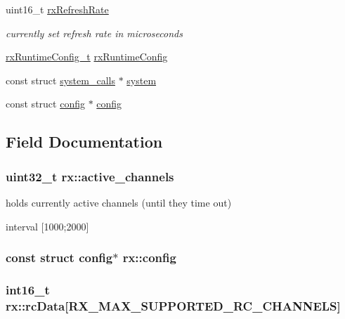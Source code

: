 \begin{DoxyCompactItemize}
uint16\+\_\+t \hyperlink{structrx_a3aade475c0c219609047fba39dce9a2a}{rx\+Refresh\+Rate}
\begin{DoxyCompactList}\small\item\em currently set refresh rate in microseconds \end{DoxyCompactList}\item 
\hyperlink{rx_2rx_8h_a42f050b55773f3d2df861b5860040fe8}{rx\+Runtime\+Config\+\_\+t} \hyperlink{structrx_a72a978d821ed96dde83bf645e959baa3}{rx\+Runtime\+Config}
\item 
const struct \hyperlink{structsystem__calls}{system\+\_\+calls} $\ast$ \hyperlink{structrx_a5fb9599652a09d1518e942c47bc0952c}{system}
\item 
const struct \hyperlink{structconfig}{config} $\ast$ \hyperlink{structrx_a4349b17cd083df91b2a1a9e2b689a968}{config}
\end{DoxyCompactItemize}


\subsection{Field Documentation}
\hypertarget{structrx_abfc8fd64f3a67de351da4d93de14aa59}{
\subsubsection[{active\+\_\+channels}]{\setlength{\rightskip}{0pt plus 5cm}uint32\+\_\+t rx\+::active\+\_\+channels}}\label{structrx_abfc8fd64f3a67de351da4d93de14aa59}


holds currently active channels (until they time out) 

interval \mbox{[}1000;2000\mbox{]} \hypertarget{structrx_a4349b17cd083df91b2a1a9e2b689a968}{
\subsubsection[{config}]{\setlength{\rightskip}{0pt plus 5cm}const struct {\bf config}$\ast$ rx\+::config}}\label{structrx_a4349b17cd083df91b2a1a9e2b689a968}
\hypertarget{structrx_a425ca7aa37d8d1c486f47104b4409e9a}{
\subsubsection[{rc\+Data}]{\setlength{\rightskip}{0pt plus 5cm}int16\+\_\+t rx\+::rc\+Data\mbox{[}{\bf R\+X\+\_\+\+M\+A\+X\+\_\+\+S\+U\+P\+P\+O\+R\+T\+E\+D\+\_\+\+R\+C\+\_\+\+C\+H\+A\+N\+N\+E\+L\+S}\mbox{]}}}\label{structrx_a425ca7aa37d8d1c486f47104b4409e9a}


